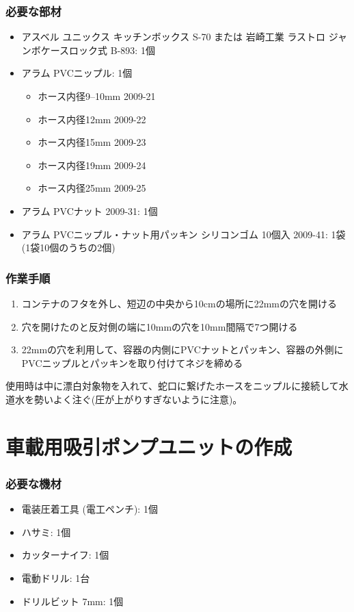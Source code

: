 \documentclass[titlepage,10pt,a4paper]{jsbook}
\begin{document}
\subsubsection{必要な部材}
\begin{itemize}
\item アスベル ユニックス キッチンボックス S-70 または 岩崎工業 ラストロ ジャンボケースロック式 B-893: 1個
\item アラム PVCニップル: 1個
\begin{itemize}
\item ホース内径9--10mm 2009-21
\item ホース内径12mm 2009-22
\item ホース内径15mm 2009-23
\item ホース内径19mm 2009-24
\item ホース内径25mm 2009-25
\end{itemize}
\item アラム PVCナット 2009-31: 1個
\item アラム PVCニップル・ナット用パッキン シリコンゴム 10個入 2009-41: 1袋 (1袋10個のうちの2個)
\end{itemize}

\subsubsection{作業手順}
\begin{enumerate}
\item コンテナのフタを外し、短辺の中央から10cmの場所に22mmの穴を開ける
\item 穴を開けたのと反対側の端に10mmの穴を10mm間隔で7つ開ける
\item 22mmの穴を利用して、容器の内側にPVCナットとパッキン、容器の外側にPVCニップルとパッキンを取り付けてネジを締める
\end{enumerate}

使用時は中に漂白対象物を入れて、蛇口に繋げたホースをニップルに接続して水道水を勢いよく注ぐ(圧が上がりすぎないように注意)。

\section{車載用吸引ポンプユニットの作成}\label{makingpumpunit}

\subsubsection{必要な機材}
\begin{itemize}
\item 電装圧着工具 (電工ペンチ): 1個
\item ハサミ: 1個
\item カッターナイフ: 1個
\item 電動ドリル: 1台
\item ドリルビット 7mm: 1個
\end{itemize}
\end{document}
